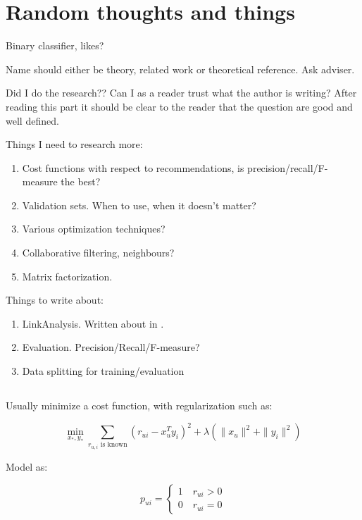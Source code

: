 \section{Random thoughts and things}

Binary classifier, likes?

Name should either be theory, related work or theoretical reference. Ask adviser.

Did I do the research?? Can I as a reader trust what the author is writing? After reading this part it should be clear to the reader that the question are good and well defined.

Things I need to research more:

\begin{enumerate}
    \item Cost functions with respect to recommendations, is precision/recall/F-measure the best?
    \item Validation sets. When to use, when it doesn't matter?
    \item Various optimization techniques?
    \item Collaborative filtering, neighbours? \cite{hu2008collaborative}
    \item Matrix factorization.
\end{enumerate}

Things to write about:

\begin{enumerate}
    \item LinkAnalysis. Written about in \cite{huang2007comparison}.
    \item Evaluation. Precision/Recall/F-measure?
    \item Data splitting for training/evaluation
\end{enumerate}


\subsection{\cite{hu2008collaborative}}

Usually minimize a cost function, with regularization such as:

\begin{equation}
    \min_{x_*, y_*} \sum_{r_{u,i} \text{ is known} } (r_{ui} - x_{u}^T y_i)^2 + \lambda(\|x_u\|^2 + \|y_i\|^2)
\end{equation}

Model as:

\begin{equation}
    p_{ui} = \begin{cases}
        1 \quad r_{ui} > 0 \\
        0 \quad r_{ui} = 0
    \end{cases}
\end{equation}

